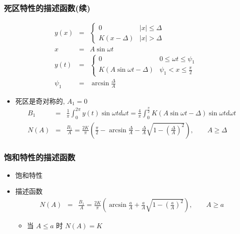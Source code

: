 \documentclass[table]{beamer}
\begin{document}
\begin{frame}
\frametitle{死区特性的描述函数(续)}
\label{sec-2-2-2}

\begin{eqnarray*}
y(x) & = &\begin{cases} 
0  &  |x| \leq \Delta \\
K(x-\Delta)  & |x|>\Delta   \end{cases} \\
x &=& A\sin\omega t \\
y(t) &=& \begin{cases} 
0  &  0\leq \omega t \leq \psi_1 \\
K(A\sin\omega t-\Delta)  & \psi_1 < x \leq \frac{\pi}{2}   \end{cases} \\
\psi_1 &=& \arcsin\frac{\Delta}{A}
\end{eqnarray*}
\begin{itemize}
\item <2-> 死区是奇对称的,  $A_1 = 0$
      \begin{eqnarray*}
      B_1 &=& \frac{1}{\pi}\int_0^{2\pi}y(t)\sin\omega t d\omega t 
           =  \frac{4}{\pi}\int_0^{\frac{\pi}{2}}K(A\sin\omega t -\Delta)\sin\omega t d\omega t \\
      N(A)&=&  \frac{B_1}{A} =\frac{2K}{\pi}\left(\frac{\pi}{2}-\arcsin\frac{\Delta}{A}-\frac{\Delta}{A}\sqrt{1-(\frac{\Delta}{A})^2}\right),\qquad A\geq\Delta
      \end{eqnarray*}
\end{itemize}
\end{frame}
\begin{frame}
\frametitle{饱和特性的描述函数}
\label{sec-2-2-3}
\begin{itemize}

\item 饱和特性
\label{sec-2-2-3-1}%

\item 描述函数\\
\label{sec-2-2-3-2}%
\begin{eqnarray*}
N(A) &=& \frac{B_1}{A} 
      =   \frac{2K}{\pi}\left(\arcsin\frac{a}{A}+\frac{a}{A}\sqrt{1-(\frac{a}{A})^2}\right) ,\qquad A\geq a 
\end{eqnarray*}
\begin{itemize}
\item <3->当  $A\leq a$  时  $N(A)=K$
\end{itemize}
\end{itemize} %
\end{frame}
\end{document}
